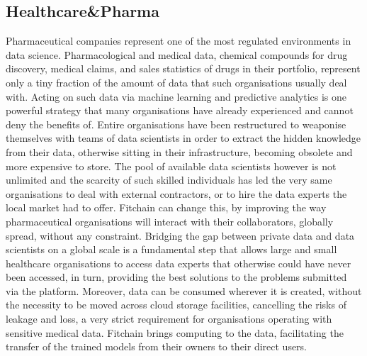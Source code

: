 \documentclass[12pt, a4paper,titlepage]{extreport}
\begin{document}
\subsection{Healthcare\&Pharma}
Pharmaceutical companies represent one of the most regulated environments in data science. Pharmacological and medical data, chemical compounds for drug discovery, medical claims, and sales statistics of drugs in their portfolio, represent only a tiny fraction of the amount of data that such organisations usually deal with. 
Acting on such data via machine learning and predictive analytics is one powerful strategy that many organisations have already experienced and cannot deny the benefits of. Entire organisations have been restructured to weaponise themselves with teams of data scientists in order to extract the hidden knowledge from their data, otherwise sitting in their infrastructure, becoming obsolete and more expensive to store. 
The pool of available data scientists however is not unlimited and the scarcity of such skilled individuals has led the very same organisations to deal with external contractors, or to hire the data experts the local market had to offer. 
Fitchain can change this, by improving the way pharmaceutical organisations will interact with their collaborators, globally spread, without any constraint. Bridging the gap between private data and data scientists on a global scale is a fundamental step that allows large and small healthcare organisations to access data experts that otherwise could have never been accessed, in turn, providing the best solutions to the problems submitted via the platform. 
Moreover, data can be consumed wherever it is created, without the necessity to be moved across cloud storage facilities, cancelling the risks of leakage and loss, a very strict requirement for organisations operating with sensitive medical data. Fitchain brings computing to the data, facilitating the transfer of the trained models from their owners to their direct users.  
\end{document}
